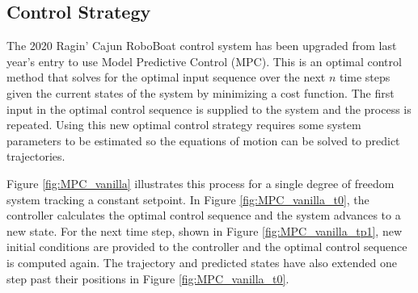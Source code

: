 \documentclass[letterpaper, 12 pt, conference]{ieeeconf}
\begin{document}
\subsection{Control Strategy}
The 2020 Ragin' Cajun RoboBoat control system has been upgraded from last year's entry to use Model Predictive Control (MPC). This is an optimal control method that solves for the optimal input sequence over the next $n$ time steps given the current states of the system by minimizing a cost function. The first input in the optimal control sequence is supplied to the system and the process is repeated. Using this new optimal control strategy requires some system parameters to be estimated so the equations of motion can be solved to predict trajectories.

Figure \ref{fig:MPC_vanilla} illustrates this process for a single degree of freedom system tracking a constant setpoint. In Figure \ref{fig:MPC_vanilla_t0}, the controller calculates the optimal control sequence and the system advances to a new state. For the next time step, shown in Figure \ref{fig:MPC_vanilla_tp1}, new initial conditions are provided to the controller and the optimal control sequence is computed again. The trajectory and predicted states have also extended one step past their positions in Figure \ref{fig:MPC_vanilla_t0}.
%
\end{document}
